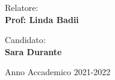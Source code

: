 \begin{titlepage}
\begin{center}
\end{center}
\vspace{20mm}

\begin{minipage}[t]{0.47\textwidth}
	{\large{Relatore:}{\normalsize\vspace{3mm}
    \bf\\ \large{Prof: Linda Badii} \normalsize\vspace{3mm}\bf}}
\end{minipage}
\hfill
\begin{minipage}[t]{0.47\textwidth}\raggedleft
	{\large{Candidato:}{\normalsize\vspace{3mm} \bf\\ \large{Sara Durante}}}
\end{minipage}

\vspace{10mm}

\begin{center}
    {\large{Anno Accademico 2021-2022}}
\end{center}

\vspace{30mm}

\end{titlepage}